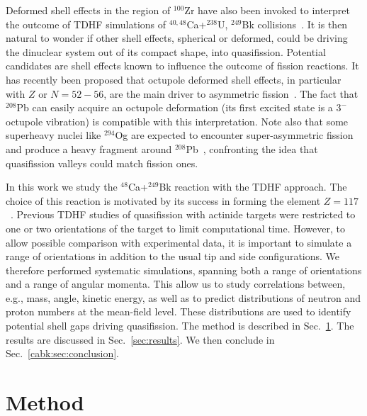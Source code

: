 Deformed shell effects in the region of $^{100}$Zr have also been invoked to interpret the outcome of TDHF simulations of $^{40,48}$Ca+$^{238}$U, $^{249}$Bk collisions~\citep{oberacker2014,umar2016}.
It is then natural to wonder if other shell effects, spherical or deformed, could be driving the dinuclear system out of its compact shape, into quasifission.
Potential candidates are shell effects known to influence the outcome of fission reactions.
It has recently been proposed that octupole deformed shell effects, in particular with $Z$ or $N=52-56$, are the main driver to asymmetric fission~\citep{scamps2018,scamps2019}.
The fact that $^{208}$Pb can easily acquire an octupole deformation (its first excited state is a $3^-$ octupole vibration) is compatible with this interpretation.
Note also that some superheavy nuclei like $^{294}$Og are expected to encounter super-asymmetric fission and produce a heavy fragment around $^{208}$Pb~\citep{poenaru2018,warda2018,matheson2019,zhang2018}, confronting the idea that quasifission valleys could match fission ones.

In this work we study the $^{48}$Ca+$^{249}$Bk reaction with the TDHF approach.
The choice of this reaction is motivated by its success in
forming the element $Z=117$~\citep{oganessian2010,oganessian2011,oganessian2012,oganessian2013,khuyagbaatar2014}.
Previous TDHF studies of quasifission with actinide targets were restricted to one or two orientations of the target to limit computational time.
However, to allow possible comparison with experimental data, it is important to simulate a range of orientations in addition to the usual tip and side configurations.
We therefore performed systematic simulations, spanning both a range of orientations and a range of angular momenta.
This allow us to study correlations between, e.g.,  mass, angle, kinetic energy, as well as to predict distributions of neutron and proton numbers at the mean-field level.
These distributions are used to identify potential shell gaps driving quasifission.
The method is described in Sec.~\ref{sec:method}.
The results are discussed in Sec.~\ref{sec:results}.
We then conclude in Sec.~\ref{cabk:sec:conclusion}.


\section{Method}\label{sec:method}

